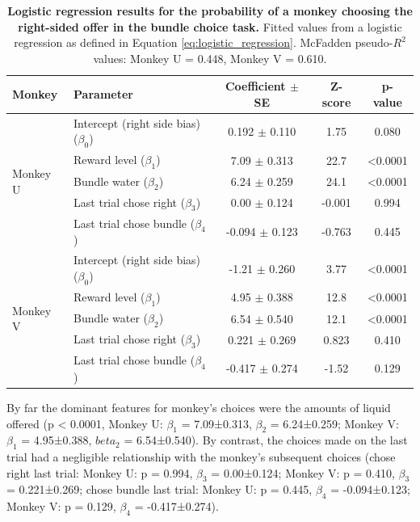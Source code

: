 \begin{table}[htbp]
    \centering
    \begin{tabular}{llccc}
        \hline
        \textbf{Monkey} & \textbf{Parameter} & \textbf{Coefficient $\pm$ SE} & \textbf{Z-score} & \textbf{p-value} \\
        \hline
        \multirow{5}{*}{Monkey U} & 
        Intercept (right side bias) ($\beta_0$) & 0.192 $\pm$ 0.110 & 1.75 & 0.080 \\
        & Reward level ($\beta_1$) & 7.09 $\pm$ 0.313 & 22.7 & <0.0001 \\
        & Bundle water ($\beta_2$) & 6.24 $\pm$ 0.259 & 24.1 & <0.0001 \\
        & Last trial chose right ($\beta_3$) & 0.00 $\pm$ 0.124 & -0.001 & 0.994 \\
        & Last trial chose bundle ($\beta_4$) & -0.094 $\pm$ 0.123 & -0.763 & 0.445 \\
        \hline
        \multirow{5}{*}{Monkey V} & 
        Intercept (right side bias) ($\beta_0$) & -1.21 $\pm$ 0.260 & 3.77 & <0.0001 \\
        & Reward level ($\beta_1$) & 4.95 $\pm$ 0.388 & 12.8 & <0.0001 \\
        & Bundle water ($\beta_2$) & 6.54 $\pm$ 0.540 & 12.1 & <0.0001 \\
        & Last trial chose right ($\beta_3$) & 0.221 $\pm$ 0.269 & 0.823 & 0.410 \\
        & Last trial chose bundle ($\beta_4$) & -0.417 $\pm$ 0.274 & -1.52 & 0.129 \\
        \hline
    \end{tabular}
\caption[Logistic regression results for the probability of a monkey choosing the right-sided offer in the bundle choice task.]{\textbf{Logistic regression results for the probability of a monkey choosing the right-sided offer in the bundle choice task.} Fitted values from a logistic regression as defined in Equation \ref{eq:logistic_regression}. McFadden pseudo-$R^2$ values: Monkey U = 0.448, Monkey V = 0.610.}
    \label{tab:logistic_regression}
\end{table}

By far the dominant features for monkey’s choices were the amounts of liquid offered (p < 0.0001, Monkey U: $\beta_1$ = 7.09±0.313, $\beta_2$ = 6.24±0.259; Monkey V: $\beta_1$ = 4.95±0.388, $beta_2$ = 6.54±0.540). By contrast, the choices made on the last trial had a negligible relationship with the monkey’s subsequent choices (chose right last trial: Monkey U: p = 0.994, $\beta_3$ = 0.00±0.124; Monkey V: p = 0.410, $\beta_3$ = 0.221±0.269; chose bundle last trial: Monkey U: p = 0.445, $\beta_4$ = -0.094±0.123; Monkey V: p = 0.129, $\beta_4$ = -0.417±0.274).

